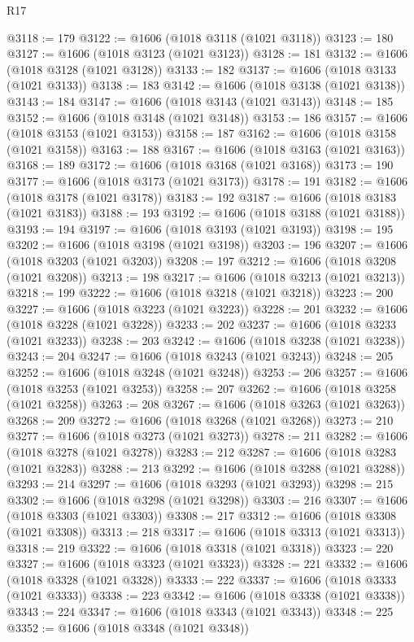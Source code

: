 \begin{lexlean}{R17}
\begin{coremodule}
{{{{{{{{{{{{{{{{{{{{{{{{{{{{{{{{{{{{{{{{{{{{{{{{{{{{{{{{{{{{{{{{{{{{{{{{{{{{{{{{{{{{{{{{{{{{{{{{{{{{{{{{{{{@3118 := 179
@3122 := @1606 (@1018 @3118 (@1021 @3118))
@3123 := 180
@3127 := @1606 (@1018 @3123 (@1021 @3123))
@3128 := 181
@3132 := @1606 (@1018 @3128 (@1021 @3128))
@3133 := 182
@3137 := @1606 (@1018 @3133 (@1021 @3133))
@3138 := 183
@3142 := @1606 (@1018 @3138 (@1021 @3138))
@3143 := 184
@3147 := @1606 (@1018 @3143 (@1021 @3143))
@3148 := 185
@3152 := @1606 (@1018 @3148 (@1021 @3148))
@3153 := 186
@3157 := @1606 (@1018 @3153 (@1021 @3153))
@3158 := 187
@3162 := @1606 (@1018 @3158 (@1021 @3158))
@3163 := 188
@3167 := @1606 (@1018 @3163 (@1021 @3163))
@3168 := 189
@3172 := @1606 (@1018 @3168 (@1021 @3168))
@3173 := 190
@3177 := @1606 (@1018 @3173 (@1021 @3173))
@3178 := 191
@3182 := @1606 (@1018 @3178 (@1021 @3178))
@3183 := 192
@3187 := @1606 (@1018 @3183 (@1021 @3183))
@3188 := 193
@3192 := @1606 (@1018 @3188 (@1021 @3188))
@3193 := 194
@3197 := @1606 (@1018 @3193 (@1021 @3193))
@3198 := 195
@3202 := @1606 (@1018 @3198 (@1021 @3198))
@3203 := 196
@3207 := @1606 (@1018 @3203 (@1021 @3203))
@3208 := 197
@3212 := @1606 (@1018 @3208 (@1021 @3208))
@3213 := 198
@3217 := @1606 (@1018 @3213 (@1021 @3213))
@3218 := 199
@3222 := @1606 (@1018 @3218 (@1021 @3218))
@3223 := 200
@3227 := @1606 (@1018 @3223 (@1021 @3223))
@3228 := 201
@3232 := @1606 (@1018 @3228 (@1021 @3228))
@3233 := 202
@3237 := @1606 (@1018 @3233 (@1021 @3233))
@3238 := 203
@3242 := @1606 (@1018 @3238 (@1021 @3238))
@3243 := 204
@3247 := @1606 (@1018 @3243 (@1021 @3243))
@3248 := 205
@3252 := @1606 (@1018 @3248 (@1021 @3248))
@3253 := 206
@3257 := @1606 (@1018 @3253 (@1021 @3253))
@3258 := 207
@3262 := @1606 (@1018 @3258 (@1021 @3258))
@3263 := 208
@3267 := @1606 (@1018 @3263 (@1021 @3263))
@3268 := 209
@3272 := @1606 (@1018 @3268 (@1021 @3268))
@3273 := 210
@3277 := @1606 (@1018 @3273 (@1021 @3273))
@3278 := 211
@3282 := @1606 (@1018 @3278 (@1021 @3278))
@3283 := 212
@3287 := @1606 (@1018 @3283 (@1021 @3283))
@3288 := 213
@3292 := @1606 (@1018 @3288 (@1021 @3288))
@3293 := 214
@3297 := @1606 (@1018 @3293 (@1021 @3293))
@3298 := 215
@3302 := @1606 (@1018 @3298 (@1021 @3298))
@3303 := 216
@3307 := @1606 (@1018 @3303 (@1021 @3303))
@3308 := 217
@3312 := @1606 (@1018 @3308 (@1021 @3308))
@3313 := 218
@3317 := @1606 (@1018 @3313 (@1021 @3313))
@3318 := 219
@3322 := @1606 (@1018 @3318 (@1021 @3318))
@3323 := 220
@3327 := @1606 (@1018 @3323 (@1021 @3323))
@3328 := 221
@3332 := @1606 (@1018 @3328 (@1021 @3328))
@3333 := 222
@3337 := @1606 (@1018 @3333 (@1021 @3333))
@3338 := 223
@3342 := @1606 (@1018 @3338 (@1021 @3338))
@3343 := 224
@3347 := @1606 (@1018 @3343 (@1021 @3343))
@3348 := 225
@3352 := @1606 (@1018 @3348 (@1021 @3348))
}}}}}}}}}}}}}}}}}}}}}}}}}}}}}}}}}}}}}}}}}}}}}}}}}}}}}}}}}}}}}}}}}}}}}}}}}}}}}}}}}}}}}}}}}}}}}}}}}}}}}}}}}}}
\end{coremodule}
\end{lexlean}
